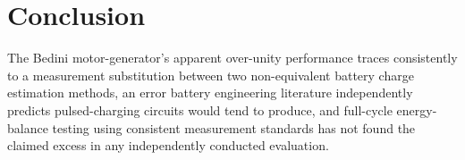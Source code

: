 \documentclass[11pt]{article}
\begin{document}
\section{Conclusion}

The Bedini motor-generator's apparent over-unity performance traces consistently to a measurement substitution between two non-equivalent battery charge estimation methods, an error battery engineering literature independently predicts pulsed-charging circuits would tend to produce, and full-cycle energy-balance testing using consistent measurement standards has not found the claimed excess in any independently conducted evaluation.
\end{document}
